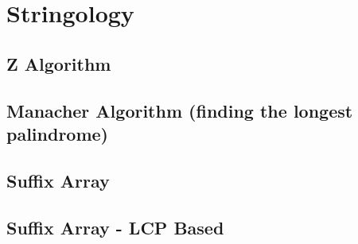 \section{Stringology}

\subsection{Z Algorithm} 



\subsection{Manacher Algorithm (finding the longest palindrome)} 




\subsection{Suffix Array}



\subsection{Suffix Array - LCP Based}


